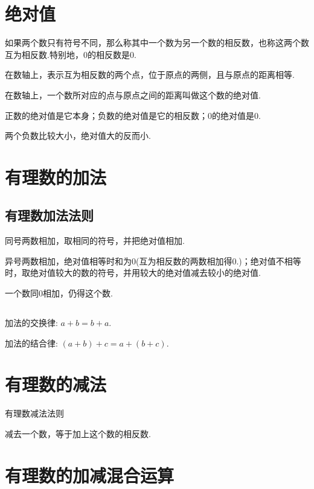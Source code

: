 \documentclass[fontset=windows]{ctexrep}
\begin{document}
\section{绝对值}
\par 如果两个数只有符号不同，那么称其中一个数为另一个数的{\heiti 相反数}，也称这两个数{\heiti 互为相反数}.特别地，$0$的相反数是$0$.
\par 在数轴上，表示互为相反数的两个点，位于原点的两侧，且与原点的距离相等.
\par 在数轴上，一个数所对应的点与原点之间的距离叫做这个数的{\heiti 绝对值}.
\par 正数的绝对值是它本身；负数的绝对值是它的相反数；$0$的绝对值是$0$.
\par 两个负数比较大小，绝对值大的反而小.
\section{有理数的加法}
\subsection{有理数加法法则}
\par 同号两数相加，取相同的符号，并把绝对值相加.
\par 异号两数相加，绝对值相等时和为$0$(互为相反数的两数相加得$0$.)；绝对值不相等时，取绝对值较大的数的符号，并用较大的绝对值减去较小的绝对值.
\par 一个数同$0$相加，仍得这个数.
\subsection{}
\par 加法的交换律: $a+b=b+a$.
\par 加法的结合律: $(a+b)+c=a+(b+c)$.
\section{有理数的减法}
\par {\heiti 有理数减法法则}
\par 减去一个数，等于加上这个数的相反数.
\section{有理数的加减混合运算}
\subsection{}
\subsection{}
\end{document}
